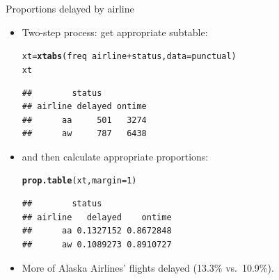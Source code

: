 \documentclass[unknownkeysallowed]{beamer}\usepackage[]{graphicx}\usepackage[]{color}
\makeatletter
\newcommand{\hlnum}[1]{\textcolor[rgb]{0.686,0.059,0.569}{#1}}%
\newcommand{\hlopt}[1]{\textcolor[rgb]{0,0,0}{#1}}%
\newcommand{\hlstd}[1]{\textcolor[rgb]{0.345,0.345,0.345}{#1}}%
\newcommand{\hlkwb}[1]{\textcolor[rgb]{0.69,0.353,0.396}{#1}}%
\newcommand{\hlkwc}[1]{\textcolor[rgb]{0.333,0.667,0.333}{#1}}%
\newcommand{\hlkwd}[1]{\textcolor[rgb]{0.737,0.353,0.396}{\textbf{#1}}}%
\newenvironment{kframe}{%
 \def\at@end@of@kframe{}%
 \ifinner\ifhmode%
  \def\at@end@of@kframe{\end{minipage}}%
  \begin{minipage}{\columnwidth}%
 \fi\fi%
 \def\FrameCommand##1{\hskip\@totalleftmargin \hskip-\fboxsep
 \colorbox{shadecolor}{##1}\hskip-\fboxsep
     \hskip-\linewidth \hskip-\@totalleftmargin \hskip\columnwidth}%
 \MakeFramed {\advance\hsize-\width
   \@totalleftmargin\z@ \linewidth\hsize
   \@setminipage}}%
 {\par\unskip\endMakeFramed%
 \at@end@of@kframe}
\newenvironment{knitrout}{}{} %
\makeatother
\begin{document}
\begin{frame}[fragile]{Proportions delayed by airline}
  
  \begin{itemize}
  \item Two-step process: get appropriate subtable:
    
\begin{knitrout}
\color{fgcolor}\begin{kframe}
\begin{alltt}
\hlstd{xt}\hlkwb{=}\hlkwd{xtabs}\hlstd{(freq}\hlopt{~}\hlstd{airline}\hlopt{+}\hlstd{status,}\hlkwc{data}\hlstd{=punctual)}
\hlstd{xt}
\end{alltt}
\begin{verbatim}
##        status
## airline delayed ontime
##      aa     501   3274
##      aw     787   6438
\end{verbatim}
\end{kframe}
\end{knitrout}

\item and then calculate appropriate proportions:
  
\begin{knitrout}
\color{fgcolor}\begin{kframe}
\begin{alltt}
\hlkwd{prop.table}\hlstd{(xt,}\hlkwc{margin}\hlstd{=}\hlnum{1}\hlstd{)}
\end{alltt}
\begin{verbatim}
##        status
## airline   delayed    ontime
##      aa 0.1327152 0.8672848
##      aw 0.1089273 0.8910727
\end{verbatim}
\end{kframe}
\end{knitrout}
\item More of Alaska Airlines' flights delayed (13.3\% vs.\ 10.9\%).
  \end{itemize}
  
\end{frame}
\end{document}
